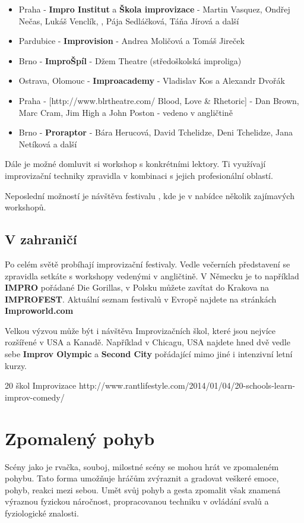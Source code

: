 \documentclass[main.tex]{subfiles}
\begin{document}
\begin{itemize}
\item  Praha - \textbf{Impro Institut} a \textbf{Škola improvizace} - Martin Vasquez, Ondřej Nečas, Lukáš Venclík,   , Pája Sedláčková, Táňa Jírová a další
\item  Pardubice - \textbf{Improvision} - Andrea Moličová a Tomáš Jireček
\item  Brno - \textbf{ImproŠpíl} - Džem Theatre (středoškolská improliga)
\item  Ostrava, Olomouc - \textbf{Improacademy} - Vladislav Kos a Alexandr Dvořák
\item  Praha - [http://www.blrtheatre.com/ Blood, Love & Rhetoric] - Dan Brown, Marc Cram, Jim High a John Poston -  vedeno v angličtině
\item  Brno - \textbf{Proraptor} - Bára Herucová, David Tchelidze, Deni Tchelidze, Jana Netíková a další
\end{itemize}
 
Dále je možné domluvit si workshop s konkrétními lektory. Ti využívají improvizační techniky zpravidla v kombinaci s jejich profesionální oblastí.  
 
 
Neposlední možností je návštěva festivalu , kde je v nabídce několik zajímavých workshopů.  
  
\subsection{ V zahraničí }  
Po celém světě probíhají improvizační festivaly. Vedle večerních představení se zpravidla setkáte s workshopy vedenými v angličtině. V Německu je to například \textbf{IMPRO} pořádané Die Gorillas, v Polsku můžete zavítat do Krakova na \textbf{IMPROFEST}. Aktuální seznam festivalů v Evropě najdete na stránkách \textbf{Improworld.com} 
 
 
Velkou výzvou může být i návštěva Improvizačních škol, které jsou nejvíce rozšířené v USA a Kanadě. Například v Chicagu, USA najdete hned dvě vedle sebe \textbf{Improv Olympic} a \textbf{Second City} pořádající mimo jiné i intenzivní letní kurzy. 
 
 
20 škol Improvizace  http://www.rantlifestyle.com/2014/01/04/20-schools-learn-improv-comedy/ 
\needspace{5cm} \section{Zpomalený pohyb} \label{zpomalený pohyb} Scény jako je rvačka, souboj, milostné scény se mohou hrát ve zpomaleném pohybu. Tato forma umožňuje hráčům zvýraznit a gradovat veškeré emoce, pohyb, reakci mezi sebou. 
Umět svůj pohyb a gesta zpomalit však znamená výraznou fyzickou náročnost, propracovanou techniku v ovládání svalů a fyziologické znalosti. 
 
\end{document}

